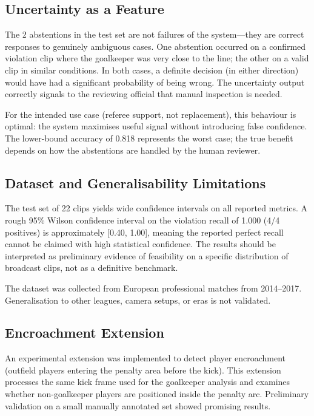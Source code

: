 \documentclass[12pt,a4paper,twoside]{article}
\begin{document}
\subsection{Uncertainty as a Feature}

The 2 abstentions in the test set are not failures of the system—they are
correct responses to genuinely ambiguous cases. One abstention occurred on
a confirmed violation clip where the goalkeeper was very close to the line;
the other on a valid clip in similar conditions. In both cases, a definite
decision (in either direction) would have had a significant probability of
being wrong. The uncertainty output correctly signals to the reviewing official
that manual inspection is needed.

For the intended use case (referee support, not replacement), this behaviour
is optimal: the system maximises useful signal without introducing false
confidence. The lower-bound accuracy of 0.818 represents the worst case; the
true benefit depends on how the abstentions are handled by the human reviewer.

\subsection{Dataset and Generalisability Limitations}

The test set of 22 clips yields wide confidence intervals on all reported metrics.
A rough 95\% Wilson confidence interval on the violation recall of 1.000
(4/4 positives) is approximately [0.40, 1.00], meaning the reported perfect
recall cannot be claimed with high statistical confidence. The results should
be interpreted as preliminary evidence of feasibility on a specific distribution
of broadcast clips, not as a definitive benchmark.

The dataset was collected from European professional matches from 2014--2017.
Generalisation to other leagues, camera setups, or eras is not validated.

\subsection{Encroachment Extension}

An experimental extension was implemented to detect player encroachment
(outfield players entering the penalty area before the kick). This extension
processes the same kick frame used for the goalkeeper analysis and examines
whether non-goalkeeper players are positioned inside the penalty arc. Preliminary
validation on a small manually annotated set showed promising results.
\end{document}
